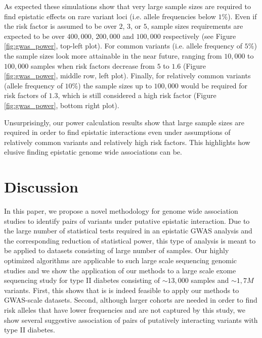 As expected these simulations show that very large sample sizes are required to find epistatic effects on rare variant loci (i.e. allele frequencies below $1\%$).
Even if the risk factor is assumed to be over $2$, $3$, or $5$, sample sizes requirements are expected to be over $400,000$, $200,000$ and $100,000$ respectively (see Figure \ref{fig:gwas_power}, top-left plot).
For common variants (i.e. allele frequency of $5\%$) the sample sizes look more attainable in the near future, ranging from $10,000$ to $100,000$ samples when risk factors decrease from $5$ to $1.6$ (Figure \ref{fig:gwas_power}, middle row, left plot).
Finally, for relatively common variants (allele frequency of $10\%$) the sample sizes up to $100,000$ would be required for risk factors of $1.3$, which is still considered a high risk factor (Figure \ref{fig:gwas_power}, bottom right plot).

Unsurprisingly, our power calculation results show that large sample sizes are required in order to find epistatic interactions even under assumptions of relatively common variants and relatively high risk factors.
This highlights how elusive finding epistatic genome wide associations can be.

\section{Discussion}

In this paper, we propose a novel methodology for genome wide association studies to identify pairs of variants under putative epistatic interaction. 
Due to the large number of statistical tests required in an epistatic GWAS analysis and the corresponding reduction of statistical power, this type of analysis is meant to be applied to datasets consisting of large number of samples.
Our highly optimized algorithms are applicable to such large scale sequencing genomic studies and we show the application of our methods to a large scale exome sequencing study for type II diabetes consisting of $\sim 13,000$ samples and $\sim 1,7M$ variants. 
First, this shows that is is indeed feasible to apply our methods to GWAS-scale datasets. 
Second, although larger cohorts are needed in order to find risk alleles that have lower frequencies and are not captured by this study, we show several suggestive association of pairs of putatively interacting variants with type II diabetes. 

